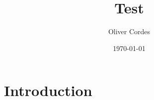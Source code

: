 \documentclass{article}
\title{Test}
\author{Oliver Cordes}
\date{\today}
\begin{document}
\maketitle

\section{Introduction}


\end{document}
